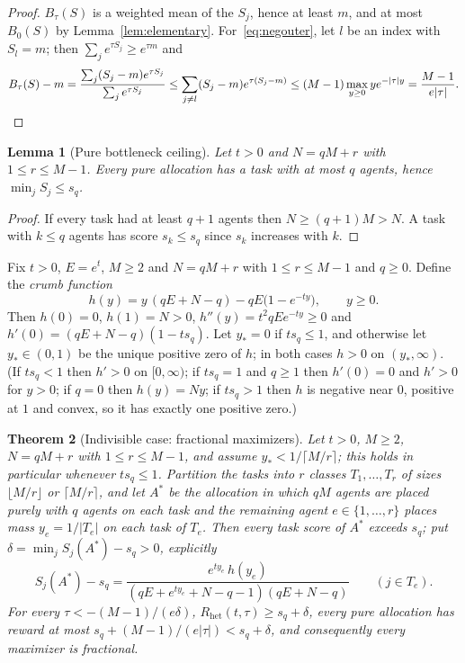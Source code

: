 \documentclass[11pt]{article}
\theoremstyle{plain}
\newtheorem{theorem}{Theorem}[section]
\newtheorem{lemma}[theorem]{Lemma}
\theoremstyle{definition}
\theoremstyle{remark}
\newcommand{\Rhet}{R_{\mathrm{het}}}
\begin{document}
\begin{proof}
$B_\tau(S)$ is a weighted mean of the $S_j$, hence at least $m$, and at most $B_0(S)$ by Lemma~\ref{lem:elementary}. For~\eqref{eq:negouter}, let $l$ be an index with $S_l=m$; then $\sum_je^{\tau S_j}\ge e^{\tau m}$ and
\[
 B_\tau(S)-m=\frac{\sum_j(S_j-m)e^{\tau S_j}}{\sum_je^{\tau S_j}}\le\sum_{j\ne l}(S_j-m)e^{\tau(S_j-m)}\le(M-1)\max_{y\ge0}ye^{-|\tau|y}=\frac{M-1}{e|\tau|}.\qedhere
\]
\end{proof}

\begin{lemma}[Pure bottleneck ceiling]\label{lem:ceiling}
Let $t>0$ and $N=qM+r$ with $1\le r\le M-1$. Every pure allocation has a task with at most $q$ agents, hence $\min_jS_j\le s_q$.
\end{lemma}

\begin{proof}
If every task had at least $q+1$ agents then $N\ge(q+1)M>N$. A task with $k\le q$ agents has score $s_k\le s_q$ since $s_k$ increases with $k$.
\end{proof}

Fix $t>0$, $E=e^t$, $M\ge2$ and $N=qM+r$ with $1\le r\le M-1$ and $q\ge0$. Define the \emph{crumb function}
\begin{equation}\label{eq:crumb}
 h(y)=y\,(qE+N-q)-qE\bigl(1-e^{-ty}\bigr),\qquad y\ge0 .
\end{equation}
Then $h(0)=0$, $h(1)=N>0$, $h''(y)=t^2qEe^{-ty}\ge0$ and $h'(0)=(qE+N-q)(1-ts_q)$. Let $y_*=0$ if $ts_q\le1$, and otherwise let $y_*\in(0,1)$ be the unique positive zero of $h$; in both cases $h>0$ on $(y_*,\infty)$. (If $ts_q<1$ then $h'>0$ on $[0,\infty)$; if $ts_q=1$ and $q\ge1$ then $h'(0)=0$ and $h'>0$ for $y>0$; if $q=0$ then $h(y)=Ny$; if $ts_q>1$ then $h$ is negative near $0$, positive at $1$ and convex, so it has exactly one positive zero.)

\begin{theorem}[Indivisible case: fractional maximizers]\label{thm:indivisible}
Let $t>0$, $M\ge2$, $N=qM+r$ with $1\le r\le M-1$, and assume $y_*<1/\lceil M/r\rceil$; this holds in particular whenever $ts_q\le1$. Partition the tasks into $r$ classes $T_1,\dots,T_r$ of sizes $\lfloor M/r\rfloor$ or $\lceil M/r\rceil$, and let $A^*$ be the allocation in which $qM$ agents are placed purely with $q$ agents on each task and the remaining agent $e\in\{1,\dots,r\}$ places mass $y_e=1/|T_e|$ on each task of $T_e$. Then every task score of $A^*$ exceeds $s_q$; put $\delta=\min_jS_j(A^*)-s_q>0$, explicitly
\[
 S_j(A^*)-s_q=\frac{e^{ty_e}\,h(y_e)}{(qE+e^{ty_e}+N-q-1)(qE+N-q)}\qquad(j\in T_e).
\]
For every $\tau<-(M-1)/(e\delta)$, $\Rhet(t,\tau)\ge s_q+\delta$, every pure allocation has reward at most $s_q+(M-1)/(e|\tau|)<s_q+\delta$, and consequently every maximizer is fractional.
\end{theorem}
\end{document}
